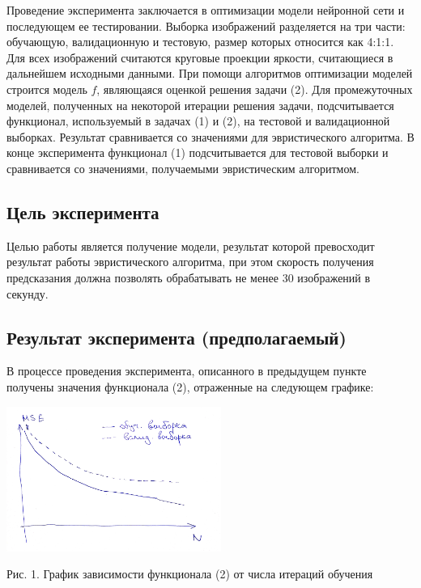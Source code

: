 \documentclass[12pt, twoside]{article}
\begin{document}
Проведение эксперимента заключается в оптимизации модели нейронной сети и последующем ее тестировании. Выборка изображений разделяется на три части: обучающую, валидационную и тестовую, размер которых относится как 4:1:1. Для всех изображений считаются круговые проекции яркости, считающиеся в дальнейшем исходными данными. При помощи алгоритмов оптимизации моделей строится модель $f$, являющаяся оценкой решения задачи (2).  Для промежуточных моделей, полученных на некоторой итерации решения задачи, подсчитывается функционал, используемый в задачах (1) и (2), на тестовой и валидационной выборках. Результат сравнивается со значениями для эвристического алгоритма. В конце эксперимента функционал (1) подсчитывается для тестовой выборки и сравнивается со значениями, получаемыми эвристическим алгоритмом.

\subsection{Цель эксперимента}

Целью работы является получение модели, результат которой превосходит результат работы эвристического алгоритма, при этом скорость получения предсказания должна позволять обрабатывать не менее 30 изображений в секунду.

\subsection{Результат эксперимента (предполагаемый)}

В процессе проведения эксперимента, описанного в предыдущем пункте получены значения функционала (2), отраженные на следующем графике:

\begin{center}
\includegraphics[width=7cm]{img/graph1.pdf}

Рис. 1. График зависимости функционала (2) от числа итераций обучения
\end{center}
\end{document}
